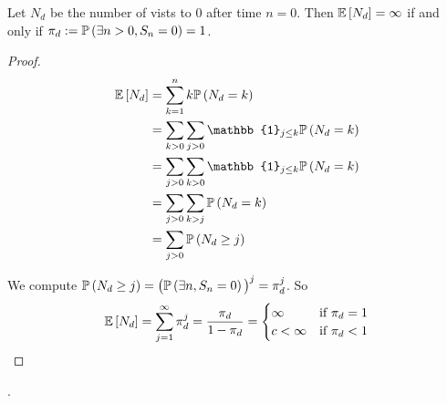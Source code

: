     \begin{claim}
        Let $N_d$ be the number of vists to $0$ after time $n = 0$.
        Then $\E{N_d} = \infty$ if and only if
         $\pi_d := \P{\exists n > 0, S_n = 0} = 1$.
    \end{claim}

    \begin{proof}
        \begin{align*}
            \E{N_d} &=
            \sum_{k=1}^n k \P{N_d = k}
            \\&=
            \sum_{k > 0} \sum_{j > 0} \mathbb{1}_{j \leq k}
                \P{N_d = k}
            \\&=
            \sum_{j > 0} \sum_{k > 0} \mathbb{1}_{j \leq k}
                \P{N_d = k}
            \\&=
            \sum_{j > 0} \sum_{k > j} \P{N_d = k}
            \\&=
            \sum_{j > 0} \P{N_d \geq j}
        \end{align*}

        We compute $\P{N_d \geq j} = \bigparenthesis{
            \P{\exists n, S_n = 0}
        }^j = \pi_d^j$.
        So \begin{align*}
            \E{N_d} = \sum_{j = 1}^\infty \pi_d^j = \frac{\pi_d}{1 - \pi_d}
            = \begin{cases}
                \infty & \tif \pi_d = 1 \\
                c < \infty & \tif \pi_d < 1
            \end{cases}
        \end{align*}
    \end{proof}


    \newpage
    .

